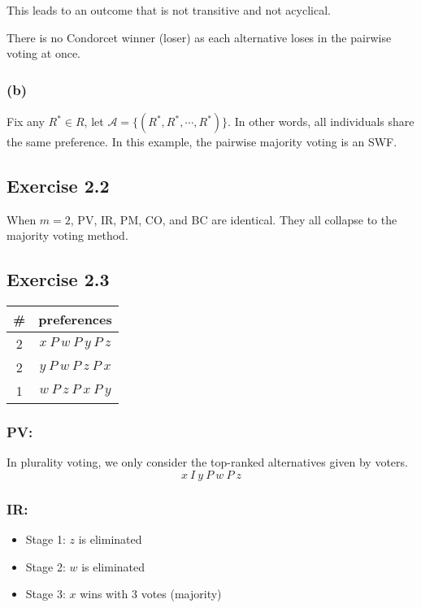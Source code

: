 \documentclass[a4paper]{article}
\begin{document}
This leads to an outcome that is not transitive and not acyclical.

There is no Condorcet winner (loser) as each alternative loses in the pairwise voting at once.

\subsubsection*{(b)}

Fix any $R^*\in R$, let $\mathscr{A}=\{(R^*, R^*,\cdots, R^*) \}$. In other words, all individuals share the same preference. In this example, the pairwise majority voting is an SWF.

\subsection*{Exercise 2.2}

When $m=2$, PV, IR, PM, CO, and BC are identical. They all collapse to the majority voting method.

\subsection*{Exercise 2.3}

\begin{table}[!htbp]
    \centering
    \begin{tabular}{c|c|}
        \# & preferences         \\ 
        \hline
        2  & $x\: P\: w\: P\: y\: P\: z$ \\
        2  & $y\: P\: w\: P\: z\: P\: x$ \\
        1  & $w\: P\: z\: P\: x\: P\: y$ \\
        \hline
    \end{tabular}
\end{table}

\subsubsection*{PV:}

In plurality voting, we only consider the top-ranked alternatives given by voters.
\[x\: I\: y\: P\: w\: P\: z  \]

\subsubsection*{IR:}

\begin{itemize}
    \item Stage 1: $z$ is eliminated
    \item Stage 2: $w$ is eliminated
    \item Stage 3: $x$ wins with 3 votes (majority)
\end{itemize}
\end{document}
